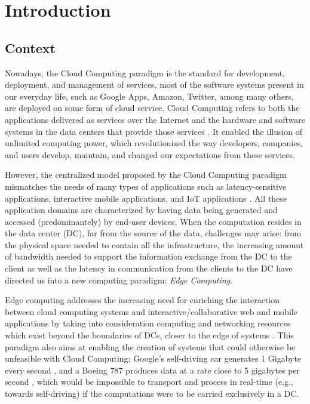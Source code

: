 


\chapter{Introduction}
\label{cha:introduction}



\section{Context}

Nowadays, the Cloud Computing paradigm is the standard for development, deployment, and management of services, most of the software systems present in our everyday life, such as Google Apps, Amazon, Twitter, among many others, are deployed on some form of cloud service. Cloud Computing refers to both the applications delivered as services over the Internet and the hardware and software systems in the data centers that provide those services \cite{10.1145/1721654.1721672}. It enabled the illusion of unlimited computing power, which revolutionized the way developers, companies, and users develop, maintain, and changed our expectations from these services.

However, the centralized model proposed by the Cloud Computing paradigm mismatches the needs of many types of applications such as latency-sensitive applications, interactive mobile applications, and IoT applications \cite{10.1145/3154815}. All these application domains are characterized by having data being generated and accessed (predominantely) by end-user devices. When the computation resides in the data center (DC), far from the source of the data, challenges may arise: from the physical space needed to contain all the infrastructure, the increasing amount of bandwidth needed to support the information exchange from the DC to the client as well as the latency in communication from the clients to the DC have directed us into a new computing paradigm: \textit{Edge Computing}.

Edge computing addresses the increasing need for enriching the interaction between cloud computing systems and interactive/collaborative web and mobile applications \cite{10.1145/242857.242867} by taking into consideration computing and networking resources which exist beyond the boundaries of DCs, closer to the edge of systems \cite{Leitao2018} \cite{7488250}. This paradigm also aims at enabling the creation of systems that could otherwise be unfeasible with Cloud Computing: Google's self-driving car generates 1 Gigabyte every second \cite{datafloq}, and a Boeing 787 produces data at a rate close to 5 gigabytes per second \cite{finnegan_2013}, which would be impossible to transport and process in real-time (e.g., towards self-driving) if the computations were to be carried exclusively in a DC.

